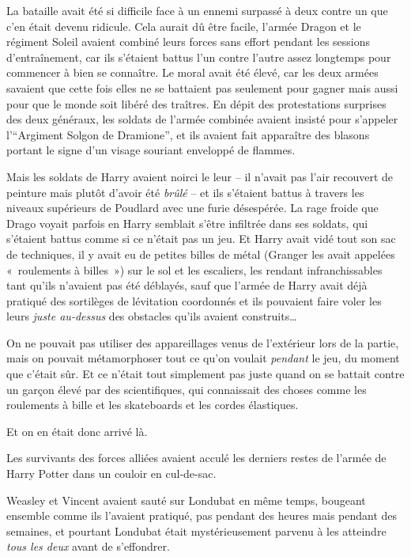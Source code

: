 La bataille avait été si difficile face à un ennemi surpassé à deux contre un que c'en était devenu ridicule. Cela aurait dû être facile, l'armée Dragon et le régiment Soleil avaient combiné leurs forces sans effort pendant les sessions d'entraînement, car ils s'étaient battus l'un contre l'autre assez longtemps pour commencer à bien se connaître. Le moral avait été élevé, car les deux armées savaient que cette fois elles ne se battaient pas seulement pour gagner mais aussi pour que le monde soit libéré des traîtres. En dépit des protestations surprises des deux généraux, les soldats de l'armée combinée avaient insisté pour s'appeler l'“Argiment Solgon de Dramione”, et ils avaient fait apparaître des blasons portant le signe d'un visage souriant enveloppé de flammes.

Mais les soldats de Harry avaient noirci le leur -- il n'avait pas l'air recouvert de peinture mais plutôt d'avoir été \emph{brûlé} -- et ils s'étaient battus à travers les niveaux supérieurs de Poudlard avec une furie désespérée. La rage froide que Drago voyait parfois en Harry semblait s'être infiltrée dans ses soldats, qui s'étaient battus comme si ce n'était pas un jeu. Et Harry avait vidé tout son sac de techniques, il y avait eu de petites billes de métal (Granger les avait appelées «~roulements à billes~») sur le sol et les escaliers, les rendant infranchissables tant qu'ils n'avaient pas été déblayés, sauf que l'armée de Harry avait déjà pratiqué des sortilèges de lévitation coordonnés et ils pouvaient faire voler les leurs \emph{juste au-dessus} des obstacles qu'ils avaient construits…

On ne pouvait pas utiliser des appareillages venus de l'extérieur lors de la partie, mais on pouvait métamorphoser tout ce qu'on voulait \emph{pendant} le jeu, du moment que c'était sûr. Et ce n'était tout simplement pas juste quand on se battait contre un garçon élevé par des scientifiques, qui connaissait des choses comme les roulements à bille et les skateboards et les cordes élastiques.

Et on en était donc arrivé là.

Les survivants des forces alliées avaient acculé les derniers restes de l'armée de Harry Potter dans un couloir en cul-de-sac.

Weasley et Vincent avaient sauté sur Londubat en même temps, bougeant ensemble comme ils l'avaient pratiqué, pas pendant des heures mais pendant des semaines, et pourtant Londubat était mystérieusement parvenu à les atteindre \emph{tous les deux} avant de s'effondrer.

